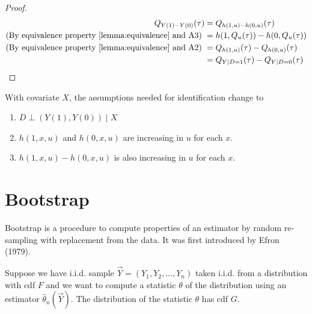 \documentclass[11pt]{elegantbook}
\begin{document}
\begin{proof}
    \begin{equation}
        \begin{aligned}
            Q_{Y(1)-Y(0)}(\tau)&=Q_{h(1,u)-h(0,u)}(\tau)\\
            \textnormal{(By equivalence property \ref{lemma:equivalence} and A3) }&=h(1,Q_u(\tau))-h(0,Q_u(\tau))\\
            \textnormal{(By equivalence property \ref{lemma:equivalence} and A2) }&=Q_{h(1,u)}(\tau)-Q_{h(0,u)}(\tau)\\
            &=Q_{Y|D=1}(\tau)-Q_{Y|D=0}(\tau)
        \end{aligned}
        \nonumber
    \end{equation}
\end{proof}
With covariate $X$, the assumptions needed for identification change to
\begin{assumption}
    \begin{enumerate}[{A}1.]
        \item $D\perp (Y(1),Y(0)) \mid X$
        \item $h(1,x,u)$ and $h(0,x,u)$ are increasing in $u$ for each $x$.
        \item $h(1,x,u)-h(0,x,u)$ is also increasing in $u$ for each $x$.
    \end{enumerate}
\end{assumption}




































\chapter{Bootstrap}
Bootstrap is a procedure to compute properties of an estimator by random re-sampling with replacement from the data. It was first introduced by Efron (1979).

Suppose we have i.i.d. sample $\vec{Y}=(Y_1,Y_2,...,Y_n)$ taken i.i.d. from a distribution with cdf $F$ and we want to compute a statistic $\theta$ of the distribution using an estimator $\hat{\theta}_n(\vec{Y})$. The distribution of the statistic $\theta$ has cdf $G$.
\end{document}
